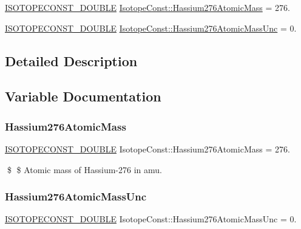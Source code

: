 \begin{DoxyCompactItemize}
\item 
\mbox{\hyperlink{group___isotope_const-_macros_ga8f45a7272ce02c0b4c65c44636ed719a}{I\+S\+O\+T\+O\+P\+E\+C\+O\+N\+S\+T\+\_\+\+D\+O\+U\+B\+LE}} \mbox{\hyperlink{group___isotope_const-_hassium-_hs276_ga561710c1969ccc782efd472468ead025}{Isotope\+Const\+::\+Hassium276\+Atomic\+Mass}} = 276.
\item 
\mbox{\hyperlink{group___isotope_const-_macros_ga8f45a7272ce02c0b4c65c44636ed719a}{I\+S\+O\+T\+O\+P\+E\+C\+O\+N\+S\+T\+\_\+\+D\+O\+U\+B\+LE}} \mbox{\hyperlink{group___isotope_const-_hassium-_hs276_ga5d1b160151568d04c9b27d4fe1921ac1}{Isotope\+Const\+::\+Hassium276\+Atomic\+Mass\+Unc}} = 0.
\end{DoxyCompactItemize}


\subsection{Detailed Description}


\subsection{Variable Documentation}
\mbox{\label{group___isotope_const-_hassium-_hs276_ga561710c1969ccc782efd472468ead025}} 
\subsubsection{\texorpdfstring{Hassium276\+Atomic\+Mass}{Hassium276AtomicMass}}
{\footnotesize\ttfamily \mbox{\hyperlink{group___isotope_const-_macros_ga8f45a7272ce02c0b4c65c44636ed719a}{I\+S\+O\+T\+O\+P\+E\+C\+O\+N\+S\+T\+\_\+\+D\+O\+U\+B\+LE}} Isotope\+Const\+::\+Hassium276\+Atomic\+Mass = 276.}

\$ \$ Atomic mass of Hassium-\/276 in amu. \mbox{\label{group___isotope_const-_hassium-_hs276_ga5d1b160151568d04c9b27d4fe1921ac1}} 
\subsubsection{\texorpdfstring{Hassium276\+Atomic\+Mass\+Unc}{Hassium276AtomicMassUnc}}
{\footnotesize\ttfamily \mbox{\hyperlink{group___isotope_const-_macros_ga8f45a7272ce02c0b4c65c44636ed719a}{I\+S\+O\+T\+O\+P\+E\+C\+O\+N\+S\+T\+\_\+\+D\+O\+U\+B\+LE}} Isotope\+Const\+::\+Hassium276\+Atomic\+Mass\+Unc = 0.}

